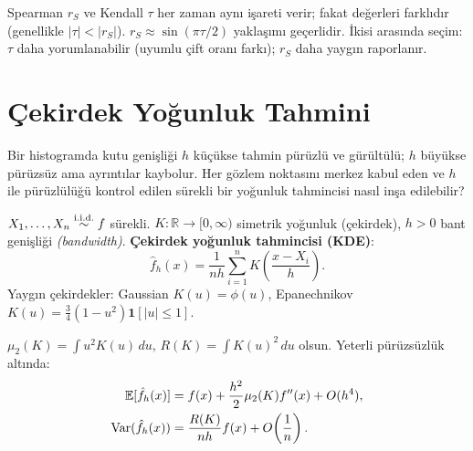 \begin{hataanalizi}
Spearman $r_S$ ve Kendall $\tau$ her zaman aynı işareti verir; fakat değerleri farklıdır (genellikle $|\tau|<|r_S|$). $r_S\approx\sin(\pi\tau/2)$ yaklaşımı geçerlidir. İkisi arasında seçim: $\tau$ daha yorumlanabilir (uyumlu çift oranı farkı); $r_S$ daha yaygın raporlanır.
\end{hataanalizi}

\section{Çekirdek Yoğunluk Tahmini}
\label{sec:kde}

\begin{kesif}
Bir histogramda kutu genişliği $h$ küçükse tahmin pürüzlü ve gürültülü;
$h$ büyükse pürüzsüz ama ayrıntılar kaybolur. Her gözlem noktasını merkez
kabul eden ve $h$ ile pürüzlülüğü kontrol edilen sürekli bir yoğunluk tahmincisi
nasıl inşa edilebilir?
\end{kesif}

\begin{tanim}\label{def:kde}
$X_1,\ldots,X_n\overset{\text{i.i.d.}}{\sim} f$ sürekli. $K:\mathbb{R}\to[0,\infty)$ simetrik yoğunluk (çekirdek), $h>0$ bant genişliği \emph{(bandwidth)}. \textbf{Çekirdek yoğunluk tahmincisi (KDE)}:
\[
  \hat{f}_h(x) = \frac{1}{nh}\sum_{i=1}^n K\!\left(\frac{x-X_i}{h}\right).
\]
Yaygın çekirdekler: Gaussian $K(u)=\phi(u)$, Epanechnikov $K(u)=\tfrac{3}{4}(1-u^2)\mathbf{1}[|u|\leq1]$.
\end{tanim}

\begin{teorem}\label{thm:kde_beklenti_varyans}
$\mu_2(K)=\int u^2 K(u)\,du$, $R(K)=\int K(u)^2\,du$ olsun. Yeterli pürüzsüzlük altında:
\begin{align*}
  \mathbb{E}[\hat{f}_h(x)] &= f(x) + \frac{h^2}{2}\mu_2(K)f''(x) + O(h^4), \\
  \operatorname{Var}(\hat{f}_h(x)) &= \frac{R(K)}{nh}f(x) + O\!\left(\frac{1}{n}\right).
\end{align*}
\end{teorem}


